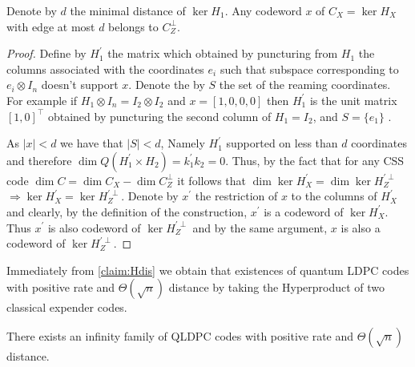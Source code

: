 \begin{claim}
  \label{claim:Hdis}
  Denote by $d$ the minimal distance of $\ker H_{1}$. Any codeword $x$ of $C_{X} = \ker H_{X}$ with edge at most $d$ belongs to $C_{Z}^{\perp}$.  
\end{claim}

\begin{proof}
  Define by $H^{\prime}_{1}$ the matrix which obtained by puncturing from $H_{1}$ the columns  associated with the coordinates $e_{i}$ such that subspace corresponding to $ e_{i} \otimes I_{n} $ doesn't support $x$. Denote the by $S$ the set of the reaming coordinates.  For example if $ H_{1} \otimes I_{n} = I_{2} \otimes I_{2}$ and $x = [1,0,0,0]$ then $H^{\prime}_{1} $ is the unit matrix $[1 , 0]^\top$ obtained by puncturing the second column of $H_{1} = I_{2}$, and $S= \{ e_{1} \} $ .  


  As $|x| < d $ we have that $|S| < d$, Namely $H^{\prime}_{1}$ supported on less than $d$ coordinates and therefore $\dim Q\left( H^{\prime}_{1} \times H_{2} \right)= k^{\prime}_{1}k_{2} = 0$.  Thus, by the fact that for any CSS code $\dim C = \dim C_{X} - \dim C_{Z}^\perp$ it follows that $\dim \ker H_{X}^{\prime}  = \dim \ker H_{Z}^{\prime \perp}$ $ \Rightarrow \ker H_{X}^{\prime}  = \ker H_{Z}^{\prime \perp}$.  Denote by $x^{\prime}$ the restriction of $x$ to the columns of $H_{X}^{\prime}$ and clearly, by the definition of the construction,  $x^{\prime}$ is a codeword of $\ker H_{X}^{\prime}$. Thus $x^{\prime}$ is also codeword of $\ker H_{Z}^{\prime \perp}$ and by the same argument, $x$ is also a codeword of $\ker H_{Z}^{\prime \perp}$. 
\end{proof}

Immediately from \cref{claim:Hdis} we obtain that existences of quantum LDPC codes with positive rate and $\Theta\left( \sqrt{n} \right)$ distance by taking the Hyperproduct of two classical expender codes.   

\begin{theorem}
  There exists an infinity family of QLDPC codes with positive rate and $\Theta(\sqrt{n})$ distance.   
\end{theorem}

%




